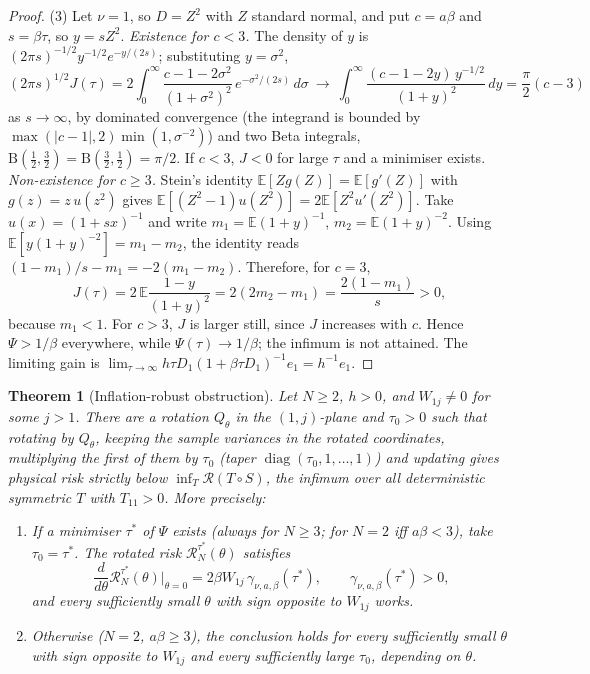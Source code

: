 \documentclass[11pt,a4paper]{article}
\numberwithin{equation}{section}
\newtheorem{theorem}{Theorem}[section]
\theoremstyle{remark}\newtheorem{remark}[theorem]{Remark}
\newcommand{\E}{\mathbb E}
\newcommand{\diag}{\operatorname{diag}}
\newcommand{\risk}{\mathcal R}
\begin{document}
\begin{proof}
(3) Let \(\nu=1\), so \(D=Z^2\) with \(Z\) standard normal, and put \(c=a\beta\) and
\(s=\beta\tau\), so \(y=sZ^2\).
\emph{Existence for \(c<3\).} The density of \(y\) is \((2\pi s)^{-1/2}y^{-1/2}e^{-y/(2s)}\); substituting \(y=\sigma^2\),
\[
 (2\pi s)^{1/2}J(\tau)=2\int_0^\infty\frac{c-1-2\sigma^2}{(1+\sigma^2)^2}\,e^{-\sigma^2/(2s)}\,d\sigma
 \ \longrightarrow\ \int_0^\infty\frac{(c-1-2y)\,y^{-1/2}}{(1+y)^2}\,dy=\frac\pi2(c-3)
\]
as \(s\to\infty\), by dominated convergence (the integrand is bounded by
\(\max(|c-1|,2)\min(1,\sigma^{-2})\)) and two Beta integrals,
\(\mathrm B(\tfrac12,\tfrac32)=\mathrm B(\tfrac32,\tfrac12)=\pi/2\). If \(c<3\), \(J<0\) for large
\(\tau\) and a minimiser exists.
\emph{Non-existence for \(c\ge3\).} Stein's identity \(\E[Zg(Z)]=\E[g'(Z)]\) with
\(g(z)=z\,u(z^2)\) gives \(\E[(Z^2-1)u(Z^2)]=2\E[Z^2u'(Z^2)]\). Take \(u(x)=(1+sx)^{-1}\) and write
\(m_1=\E(1+y)^{-1}\), \(m_2=\E(1+y)^{-2}\). Using \(\E[y(1+y)^{-2}]=m_1-m_2\), the identity reads
\((1-m_1)/s-m_1=-2(m_1-m_2)\). Therefore, for \(c=3\),
\[
 J(\tau)=2\,\E\frac{1-y}{(1+y)^2}=2(2m_2-m_1)=\frac{2(1-m_1)}{s}>0 ,
\]
because \(m_1<1\). For \(c>3\), \(J\) is larger still, since \(J\) increases with \(c\). Hence
\(\Psi>1/\beta\) everywhere, while \(\Psi(\tau)\to1/\beta\); the infimum is not attained. The limiting
gain is \(\lim_{\tau\to\infty}h\tau D_1(1+\beta\tau D_1)^{-1}e_1=h^{-1}e_1\).
\end{proof}

\begin{theorem}[Inflation-robust obstruction]\label{thm:inflation}
Let \(N\ge2\), \(h>0\), and \(W_{1j}\ne0\) for some \(j>1\). There are a rotation \(Q_\theta\) in the
\((1,j)\)-plane and \(\tau_0>0\) such that rotating by \(Q_\theta\), keeping the sample variances
in the rotated coordinates, multiplying the first of them by \(\tau_0\) (taper
\(\diag(\tau_0,1,\ldots,1)\)) and updating gives physical risk strictly below
\(\inf_T\risk(T\circ S)\), the infimum over all deterministic symmetric \(T\) with \(T_{11}>0\).
More precisely:
\begin{enumerate}
\item If a minimiser \(\tau^*\) of \(\Psi\) exists (always for \(N\ge3\); for \(N=2\) iff
 \(a\beta<3\)), take \(\tau_0=\tau^*\). The rotated risk \(\risk^{\tau^*}_N(\theta)\) satisfies
 \begin{equation}\label{eq:inflgrad}
 \frac{d}{d\theta}\risk^{\tau^*}_N(\theta)\Big|_{\theta=0}
 =2\beta W_{1j}\,\gamma_{\nu,a,\beta}(\tau^*),\qquad \gamma_{\nu,a,\beta}(\tau^*)>0,
 \end{equation}
 and every sufficiently small \(\theta\) with sign opposite to \(W_{1j}\) works.
\item Otherwise (\(N=2\), \(a\beta\ge3\)), the conclusion holds for every sufficiently small
 \(\theta\) with sign opposite to \(W_{1j}\) and every sufficiently large \(\tau_0\), depending on
 \(\theta\).
\end{enumerate}
\end{theorem}
\end{document}
